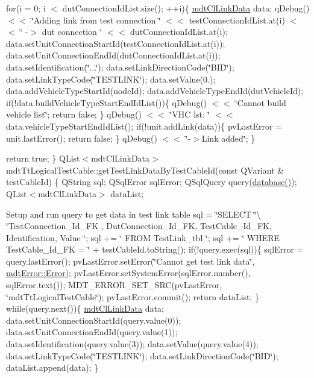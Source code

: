for(i = 0; i $<$ dut\-Connection\-Id\-List.\-size(); ++i)\{ \hyperlink{classmdt_cl_link_data}{mdt\-Cl\-Link\-Data} data; q\-Debug() $<$$<$ \char`\"{}\-Adding link from test connection \char`\"{} $<$$<$ test\-Connection\-Id\-List.\-at(i) $<$$<$ \char`\"{} -\/$>$ dut connection \char`\"{} $<$$<$ dut\-Connection\-Id\-List.\-at(i); data.\-set\-Unit\-Connection\-Start\-Id(test\-Connection\-Id\-List.\-at(i)); data.\-set\-Unit\-Connection\-End\-Id(dut\-Connection\-Id\-List.\-at(i)); data.\-set\-Identification(\char`\"{}...\char`\"{}); data.\-set\-Link\-Direction\-Code(\char`\"{}\-B\-I\-D\char`\"{}); data.\-set\-Link\-Type\-Code(\char`\"{}\-T\-E\-S\-T\-L\-I\-N\-K\char`\"{}); data.\-set\-Value(0.); data.\-add\-Vehicle\-Type\-Start\-Id(node\-Id); data.\-add\-Vehicle\-Type\-End\-Id(dut\-Vehicle\-Id); if(!data.build\-Vehicle\-Type\-Start\-End\-Id\-List())\{ q\-Debug() $<$$<$ \char`\"{}\-Cannot build vehicle list\char`\"{}; return false; \} q\-Debug() $<$$<$ \char`\"{}\-V\-H\-C lst\-: \char`\"{} $<$$<$ data.\-vehicle\-Type\-Start\-End\-Id\-List(); if(!unit.add\-Link(data))\{ pv\-Last\-Error = unit.\-last\-Error(); return false; \} q\-Debug() $<$$<$ \char`\"{}-\/$>$\-Link added\char`\"{}; \}

return true; \} Q\-List$<$mdt\-Cl\-Link\-Data$>$ mdt\-Tt\-Logical\-Test\-Cable\-::get\-Test\-Link\-Data\-By\-Test\-Cable\-Id(const Q\-Variant \& test\-Cable\-Id) \{ Q\-String sql; Q\-Sql\-Error sql\-Error; Q\-Sql\-Query query(\hyperlink{classmdt_tt_base_a82c3f795b6cb8101b12e0e0ef340c1be}{database()}); Q\-List$<$mdt\-Cl\-Link\-Data$>$ data\-List;

Setup and run query to get data in test link table sql = \char`\"{}\-S\-E\-L\-E\-C\-T \char`\"{}\textbackslash{} \char`\"{}\-Test\-Connection\-\_\-\-Id\-\_\-\-F\-K , Dut\-Connection\-\_\-\-Id\-\_\-\-F\-K, Test\-Cable\-\_\-\-Id\-\_\-\-F\-K, Identification, Value \char`\"{}; sql += \char`\"{} F\-R\-O\-M Test\-Link\-\_\-tbl \char`\"{}; sql += \char`\"{} W\-H\-E\-R\-E Test\-Cable\-\_\-\-Id\-\_\-\-F\-K = \char`\"{} + test\-Cable\-Id.\-to\-String(); if(!query.exec(sql))\{ sql\-Error = query.\-last\-Error(); pv\-Last\-Error.\-set\-Error(\char`\"{}\-Cannot get test link data\char`\"{}, \hyperlink{classmdt_error_a5c8b1a040e2feaa848f6201d6b6f0cd7a35f5c05a7d15b6433445cdbffa6d5260}{mdt\-Error\-::\-Error}); pv\-Last\-Error.\-set\-System\-Error(sql\-Error.\-number(), sql\-Error.\-text()); M\-D\-T\-\_\-\-E\-R\-R\-O\-R\-\_\-\-S\-E\-T\-\_\-\-S\-R\-C(pv\-Last\-Error, \char`\"{}mdt\-Tt\-Logical\-Test\-Cable\char`\"{}); pv\-Last\-Error.\-commit(); return data\-List; \} while(query.\-next())\{ \hyperlink{classmdt_cl_link_data}{mdt\-Cl\-Link\-Data} data; data.\-set\-Unit\-Connection\-Start\-Id(query.\-value(0)); data.\-set\-Unit\-Connection\-End\-Id(query.\-value(1)); data.\-set\-Identification(query.\-value(3)); data.\-set\-Value(query.\-value(4)); data.\-set\-Link\-Type\-Code(\char`\"{}\-T\-E\-S\-T\-L\-I\-N\-K\char`\"{}); data.\-set\-Link\-Direction\-Code(\char`\"{}\-B\-I\-D\char`\"{}); data\-List.\-append(data); \}

